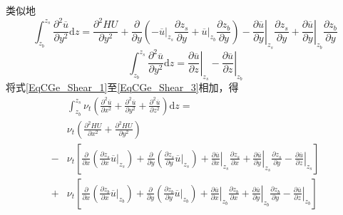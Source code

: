 类似地
\begin{equation}
    \int_{z_{b}}^{ z_{s}}\!
    \frac{\partial^{2} \overline{u}}{\partial y^{2}}
    \mathrm{d}z
    =
    \frac{\partial^{2} HU}{\partial y^{2}} +
    \frac{\partial}{\partial y}
    \left(
    -
    \left.\overline{u}\right|_{z_{s}}\frac{\partial  z_{s}}{\partial y}
    +
    \left.\overline{u}\right|_{z_{b}}\frac{\partial z_{b}}{\partial y}
    \right)
    -
    \left.\frac{\partial \overline{u}}{\partial y}\right|_{z_{s}}\frac{\partial  z_{s}}{\partial y}
    +
    \left.\frac{\partial \overline{u}}{\partial y}\right|_{z_{b}}\frac{\partial z_{b}}{\partial y}
  \label{EqCGe_Shear_2}
\end{equation}
\begin{equation}
    \int_{z_{b}}^{ z_{s}}\!
    \frac{\partial^{2} \overline{u}}{\partial y^{2}}
    \mathrm{d}z
    =
    \left.\frac{\partial \overline{u}}{\partial z}\right|_{z_{s}}
      -
      \left.\frac{\partial \overline{u}}{\partial z}\right|_{z_{b}}
  \label{EqCGe_Shear_3}
\end{equation}
将式\eqref{EqCGe_Shear_1}至\eqref{EqCGe_Shear_3}相加，得
\begin{equation}
  \begin{aligned}
    &\int_{z_{b}}^{ z_{s}}\!
    \nu_{t}
    \left(
      \frac{\partial^{2} \overline{u}}{\partial x^{2}} +
      \frac{\partial^{2} \overline{u}}{\partial y^{2}} +
      \frac{\partial^{2} \overline{u}}{\partial z^{2}}
    \right)
    \mathrm{d}z =\\
     &
    \nu_{t}
    \left(
    \frac{\partial^{2} HU}{\partial x^{2}} +
    \frac{\partial^{2} HU}{\partial y^{2}}
  \right)
  \\
      -&\nu_{t}
      \left[
    \frac{\partial}{\partial x}
    \left(
    \frac{\partial  z_{s}}{\partial x}
\left.\overline{u}\right|_{z_{s}}
\right)
+
    \frac{\partial}{\partial y}
    \left(
    \frac{\partial  z_{s}}{\partial y}
\left.\overline{u}\right|_{z_{s}}
\right)
+
\left.\frac{\partial \overline{u}}{\partial x}\right|_{z_{s}}
    \frac{\partial  z_{s}}{\partial x}
  +
\left.\frac{\partial \overline{u}}{\partial y}\right|_{z_{s}}
    \frac{\partial  z_{s}}{\partial y}
    -
    \left.\frac{\partial \overline{u}}{\partial z}\right|_{z_{s}}
        \right]
        \\
      +&\nu_{t}
      \left[
    \frac{\partial}{\partial x}
    \left(
    \frac{\partial z_{b}}{\partial x}
\left.\overline{u}\right|_{z_{b}}
\right)
+
    \frac{\partial}{\partial y}
    \left(
    \frac{\partial z_{b}}{\partial y}
\left.\overline{u}\right|_{z_{b}}
\right)
+
\left.\frac{\partial \overline{u}}{\partial x}\right|_{z_{b}}
    \frac{\partial z_{b}}{\partial x}
  +
\left.\frac{\partial \overline{u}}{\partial y}\right|_{z_{b}}
    \frac{\partial z_{b}}{\partial y}
-
    \left.\frac{\partial \overline{u}}{\partial z}\right|_{z_{b}}
        \right]
  \end{aligned}
  \label{EqCGe_Shear_Total}
\end{equation}
